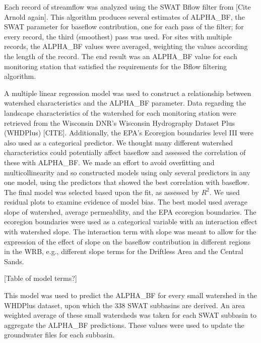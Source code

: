 	Each record of streamflow was analyzed using the SWAT Bflow filter from [Cite Arnold again]. This algorithm produces several estimates of ALPHA\_BF, the SWAT parameter for baseflow contribution, one for each pass of the filter; for every record, the third (smoothest) pass was used. For sites with multiple records, the ALPHA\_BF values were averaged, weighting the values according the length of the record. The end result was an ALPHA\_BF value for each monitoring station that satisfied the requirements for the Bflow filtering algorithm.  

	A multiple linear regression model was used to construct a relationship between watershed characteristics and the ALPHA\_BF parameter. Data regarding the landscape characteristics of the watershed for each monitoring station were retrieved from the Wisconsin DNR's Wisconsin Hydrography Dataset Plus (WHDPlus) [CITE]. Additionally, the EPA's Ecoregion boundaries level III were also used as a categorical predictor. We thought many different watershed characteristics could potentially affect baseflow and assessed the correlation of these with ALPHA\_BF. We made an effort to avoid overfitting and multicollinearity and so constructed models using only several predictors in any one model, using the predictors that showed the best correlation with baseflow. The final model was selected based upon the fit, as assessed by $R^2$. We used residual plots to examine evidence of model bias. The best model used average slope of watershed, average permeability, and the EPA ecoregion boundaries. The ecoregion boundaries were used as a categorical variable with an interaction effect with watershed slope. The interaction term with slope was meant to allow for the expression of the effect of slope on the baseflow contribution in different regions in the WRB, e.g., different slope terms for the Driftless Area and the Central Sands. 
	
	[Table of model terms?]
	
	This model was used to predict the ALPHA\_BF for every small watershed in the WHDPlus dataset, upon which the 338 SWAT subbasins are derived. An area weighted average of these small watersheds was taken for each SWAT subbasin to aggregate the ALPHA\_BF predictions. These values were used to update the groundwater files for each subbasin.